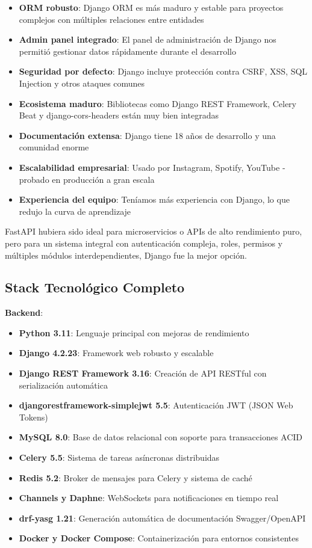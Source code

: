 \begin{itemize}
    \item \textbf{ORM robusto}: Django ORM es más maduro y estable para proyectos complejos con múltiples relaciones entre entidades
    \item \textbf{Admin panel integrado}: El panel de administración de Django nos permitió gestionar datos rápidamente durante el desarrollo
    \item \textbf{Seguridad por defecto}: Django incluye protección contra CSRF, XSS, SQL Injection y otros ataques comunes
    \item \textbf{Ecosistema maduro}: Bibliotecas como Django REST Framework, Celery Beat y django-cors-headers están muy bien integradas
    \item \textbf{Documentación extensa}: Django tiene 18 años de desarrollo y una comunidad enorme
    \item \textbf{Escalabilidad empresarial}: Usado por Instagram, Spotify, YouTube - probado en producción a gran escala
    \item \textbf{Experiencia del equipo}: Teníamos más experiencia con Django, lo que redujo la curva de aprendizaje
\end{itemize}

FastAPI hubiera sido ideal para microservicios o APIs de alto rendimiento puro, pero para un sistema integral con autenticación compleja, roles, permisos y múltiples módulos interdependientes, Django fue la mejor opción.

\subsection{Stack Tecnológico Completo}

\textbf{Backend}:
\begin{itemize}
    \item \textbf{Python 3.11}: Lenguaje principal con mejoras de rendimiento
    \item \textbf{Django 4.2.23}: Framework web robusto y escalable
    \item \textbf{Django REST Framework 3.16}: Creación de API RESTful con serialización automática
    \item \textbf{djangorestframework-simplejwt 5.5}: Autenticación JWT (JSON Web Tokens)
    \item \textbf{MySQL 8.0}: Base de datos relacional con soporte para transacciones ACID
    \item \textbf{Celery 5.5}: Sistema de tareas asíncronas distribuidas
    \item \textbf{Redis 5.2}: Broker de mensajes para Celery y sistema de caché
    \item \textbf{Channels y Daphne}: WebSockets para notificaciones en tiempo real
    \item \textbf{drf-yasg 1.21}: Generación automática de documentación Swagger/OpenAPI
    \item \textbf{Docker y Docker Compose}: Containerización para entornos consistentes
\end{itemize}

